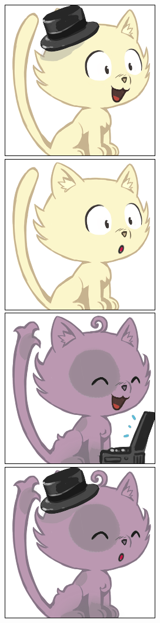 \documentclass[a4paper, 12pt]{article}
\begin{document}
  \includegraphics[scale=0.45]{out/85.png}
  \includegraphics[scale=0.45]{out/16.png}
  \includegraphics[scale=0.45]{out/56.png}
  \includegraphics[scale=0.45]{out/95.png}
\end{document}
